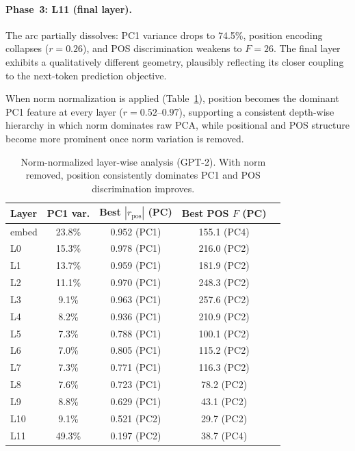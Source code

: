 \documentclass[11pt,a4paper]{article}
\begin{document}
\paragraph{Phase~3: L11 (final layer).} The arc partially dissolves: PC1 variance drops to 74.5\%, position encoding collapses ($r = 0.26$), and POS discrimination weakens to $F = 26$. The final layer exhibits a qualitatively different geometry, plausibly reflecting its closer coupling to the next-token prediction objective.

When norm normalization is applied (Table~\ref{tab:layerwisenorm}), position becomes the dominant PC1 feature at every layer ($r = 0.52$--$0.97$), supporting a consistent depth-wise hierarchy in which norm dominates raw PCA, while positional and POS structure become more prominent once norm variation is removed.

\begin{table}[H]
\centering
\caption{Norm-normalized layer-wise analysis (GPT-2). With norm removed, position consistently dominates PC1 and POS discrimination improves.}
\label{tab:layerwisenorm}
\begin{tabular}{lcccc}
\toprule
Layer & PC1 var. & Best $|r_\text{pos}|$ (PC) & Best POS $F$ (PC) \\
\midrule
embed & 23.8\% & 0.952 (PC1) & 155.1 (PC4) \\
L0    & 15.3\% & 0.978 (PC1) & 216.0 (PC2) \\
L1    & 13.7\% & 0.959 (PC1) & 181.9 (PC2) \\
L2    & 11.1\% & 0.970 (PC1) & 248.3 (PC2) \\
L3    &  9.1\% & 0.963 (PC1) & 257.6 (PC2) \\
L4    &  8.2\% & 0.936 (PC1) & 210.9 (PC2) \\
L5    &  7.3\% & 0.788 (PC1) & 100.1 (PC2) \\
L6    &  7.0\% & 0.805 (PC1) & 115.2 (PC2) \\
L7    &  7.3\% & 0.771 (PC1) & 116.3 (PC2) \\
L8    &  7.6\% & 0.723 (PC1) &  78.2 (PC2) \\
L9    &  8.8\% & 0.629 (PC1) &  43.1 (PC2) \\
L10   &  9.1\% & 0.521 (PC2) &  29.7 (PC2) \\
L11   & 49.3\% & 0.197 (PC2) &  38.7 (PC4) \\
\bottomrule
\end{tabular}
\end{table}

\end{document}
